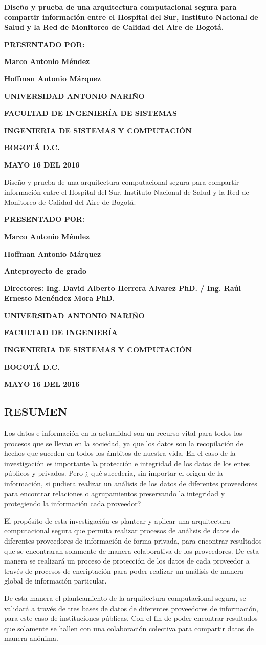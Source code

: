 \documentclass[a4paper, 11pt, oneside]{article}
\theoremstyle{definition}
\theoremstyle{remark}
\newcommand\portada{
\begin{titlepage}
		\begin{center}
			{\large \bf Diseño y prueba de una arquitectura computacional segura para compartir información entre el Hospital del Sur, Instituto Nacional de Salud y la Red de Monitoreo de Calidad del Aire de Bogotá.}
            
			\vfill
 			{\large\bf PRESENTADO POR: \par}
			{\large\bf Marco Antonio Méndez \par}
            {\large\bf Hoffman Antonio Márquez}
			\vfill
			{\large\bf UNIVERSIDAD ANTONIO NARIÑO  \par}
			{\large\bf FACULTAD DE INGENIERÍA DE SISTEMAS \par}
			{\large\bf INGENIERIA DE SISTEMAS Y COMPUTACIÓN \par}
			{\large\bf BOGOTÁ D.C.\par}
			{\large\bf MAYO 16 DEL 2016 \par}
		\end{center}
\end{titlepage}
}
\newcommand\contraportada{
	\begin{titlepage}
		\begin{center}
{Diseño y prueba de una arquitectura computacional segura para compartir información entre el Hospital del Sur, Instituto Nacional de Salud y la Red de Monitoreo de Calidad del Aire de Bogotá.} 
			\vfill
 			{\large\bf PRESENTADO POR: \par}
			{\large\bf Marco Antonio Méndez \par}
            {\large\bf Hoffman Antonio Márquez}
			\vfill
			{\large\bf Anteproyecto de grado \par}
			\vfill
			{\large\bf Directores: Ing. David Alberto Herrera Alvarez PhD. / Ing. Raúl Ernesto Menéndez Mora PhD. 
\par}
			\vfill
			{\large\bf UNIVERSIDAD ANTONIO NARIÑO \par}
			{\large\bf FACULTAD DE INGENIERÍA \par}
			{\large\bf INGENIERIA DE SISTEMAS Y COMPUTACIÓN \par}
			{\large\bf BOGOTÁ D.C.\par}
			{\large\bf MAYO 16 DEL 2016 \par}
		\end{center}
\end{titlepage}
}
\begin{document}
\portada
\contraportada
 




\renewcommand\contentsname{\centering TABLA DE CONTENIDOS}
\tableofcontents
\clearpage





\renewcommand{\thesection}{}
\renewcommand{\thesubsection}{\arabic{section}.\arabic{subsection}}
\makeatletter
\def\@seccntformat#1{\csname #1ignore\expandafter\endcsname\csname the#1\endcsname\quad}
\let\sectionignore\@gobbletwo
\let\latex@numberline\numberline
\def\numberline#1{\if\relax#1\relax\else\latex@numberline{#1}\fi}
\makeatother

\begin{center}
 \section{RESUMEN}
 \end{center}
 
Los datos e información en la actualidad son un recurso vital para todos los procesos que se llevan en la sociedad, ya que los datos son la recopilación de hechos que suceden en todos los ámbitos de nuestra vida. En el caso de la investigación es importante la protección e integridad de los datos de los entes públicos y privados. Pero ¿ qué sucedería, sin importar el origen de la información, si pudiera realizar un análisis de los datos de diferentes proveedores para encontrar relaciones o agrupamientos preservando la integridad y protegiendo la información cada proveedor?

El propósito de esta investigación es plantear y aplicar una arquitectura computacional segura que permita realizar procesos de análisis de datos de diferentes proveedores de información de forma privada, para encontrar resultados que se encontraran solamente de manera colaborativa de los proveedores. De esta manera se realizará un proceso de protección de los datos de cada proveedor a través de procesos de encriptación para poder realizar un análisis de manera global de información particular. 

De esta manera el planteamiento de la arquitectura computacional segura, se validará a través de tres bases de datos de diferentes proveedores de información, para este caso de instituciones públicas. Con el fin de poder encontrar resultados que solamente se hallen con una colaboración colectiva para compartir datos de manera anónima.
 \clearpage
 
\end{document}
